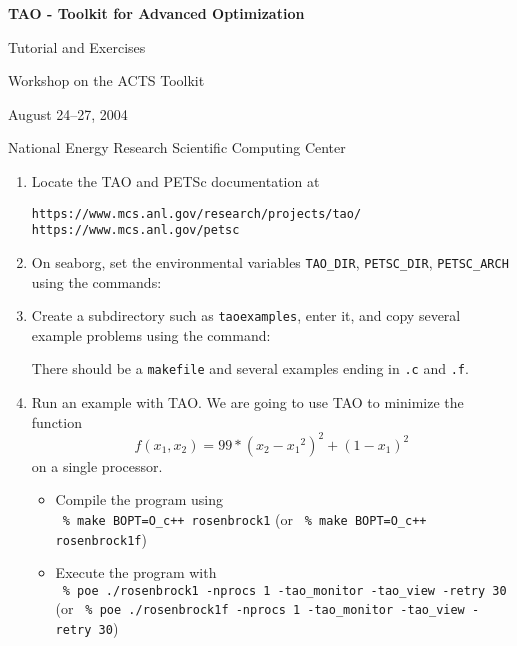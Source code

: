 \documentclass[11pt]{article}
\begin{document}
\begin{center}
{\bf
TAO - Toolkit for Advanced Optimization
        
Tutorial and Exercises

\vspace{0.25in}

Workshop on the ACTS Toolkit

August 24--27, 2004

National Energy Research Scientific Computing Center
}
\end{center}
\vspace{0.25in}

\begin{enumerate}

\item Locate the TAO and PETSc documentation at 
\begin{alltt}
https://www.mcs.anl.gov/research/projects/tao/
https://www.mcs.anl.gov/petsc
\end{alltt}

\item On seaborg, set the environmental variables
\texttt{TAO\_DIR}, \texttt{PETSC\_DIR}, \texttt{PETSC\_ARCH} 
using the commands:
\begin{alltt}
% module load tao/1.7
% module load petsc/2.2.1
\end{alltt}

\item Create a subdirectory such as \texttt{taoexamples}, enter it, and copy several example problems using the
command:
\begin{alltt}
% mkdir taoexamples
% cd taoexamples
% cp -R \$TAO_DIR/src/unconstrained/tutorials/* .
% ls
\end{alltt}
There should be a \texttt{makefile} and several examples ending in \texttt{.c} and \texttt{.f}.

\item Run an example with TAO.
We are going to use TAO to minimize the function 
\[
    f(x_1,x_2) = 99*(x_2-{x_1}^2)^2 + (1-x_1)^2 
\]
on a single processor.
\begin{itemize}

 \item Compile the program using \\
  \quad \texttt{ \% make BOPT=O\_c++ rosenbrock1} 
  (or \texttt{ \% make BOPT=O\_c++ rosenbrock1f})

 \item Execute the program with \\
  \quad \texttt{ \% poe ./rosenbrock1 -nprocs 1 -tao\_monitor -tao\_view -retry 30} (or
  \texttt{ \% poe ./rosenbrock1f -nprocs 1 -tao\_monitor -tao\_view -retry 30})


\end{itemize}
\end{enumerate}
\end{document}
